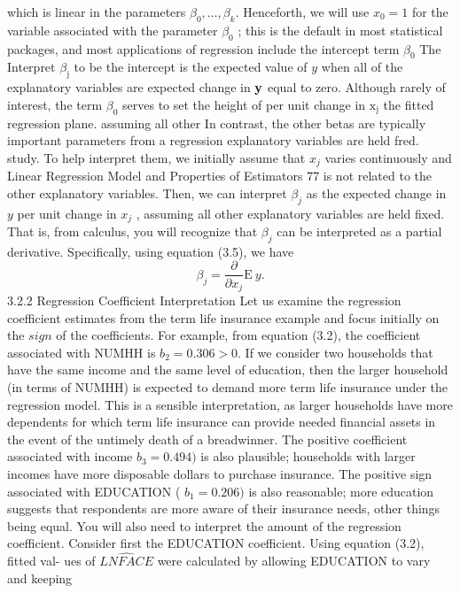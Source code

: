 \documentclass[11pt]{article}
\begin{document}
which is linear in the parameters \(\beta_{0} , \ldots, \beta_{k} .\) Henceforth, we will use \(x_{0}=1\) for
 the variable associated with the parameter \(\beta_{0}\) ; this is the default in most statistical
 packages, and most applications of regression include the intercept term \(\beta_{0}\) The
Interpret \(\beta_{\mathrm{j}}\) to be the intercept is the expected value of \(y\) when all of the explanatory variables are
expected change in \({\bf y}\) equal to zero. Although rarely of interest, the term \(\beta_{0}\) serves to set the height of
 per unit change in \(\mathrm{x_{j}}\) the fitted regression plane.
 assuming all other In contrast, the other betas are typically important parameters from a regression
explanatory variables
are held fred. study. To help interpret them, we initially assume that \(x_{j}\) varies continuously and
 Linear Regression Model and Properties of Estimators 77
is not related to the other explanatory variables. Then, we can interpret \(\beta_{j}\) as
the expected change in \(y\) per unit change in \(x_{j}\) , assuming all other explanatory
variables are held fixed. That is, from calculus, you will recognize that \(\beta_{j}\) can be
interpreted as a partial derivative. Specifically, using equation (3.5), we have
\[
\beta_{j}=\frac{\partial} {\partial x_{j}} \mathrm{E} ~ y .
\]
3.2.2 Regression Coefficient Interpretation
Let us examine the regression coefficient estimates from the term life insurance
example and focus initially on the \(s i g n\) of the coefficients. For example, from
equation (3.2), the coefficient associated with NUMHH is \(b_{2}=0 . 3 0 6 > 0 .\) If
we consider two households that have the same income and the same level
of education, then the larger household (in terms of NUMHH) is expected to
 demand more term life insurance under the regression model. This is a sensible
 interpretation, as larger households have more dependents for which term life
 insurance can provide needed financial assets in the event of the untimely death
of a breadwinner. The positive coefficient associated with income \(b_{3}=0 . 4 9 4 )\)
 is also plausible; households with larger incomes have more disposable dollars to
 purchase insurance. The positive sign associated with EDUCATION ( \(b_{1}=0 . 2 0 6 )\)
is also reasonable; more education suggests that respondents are more aware of
their insurance needs, other things being equal.
You will also need to interpret the amount of the regression coefficient.
Consider first the EDUCATION coefficient. Using equation (3.2), fitted val-
ues of \(\widehat{L N F A C E}\) were calculated by allowing EDUCATION to vary and keeping
\end{document}

